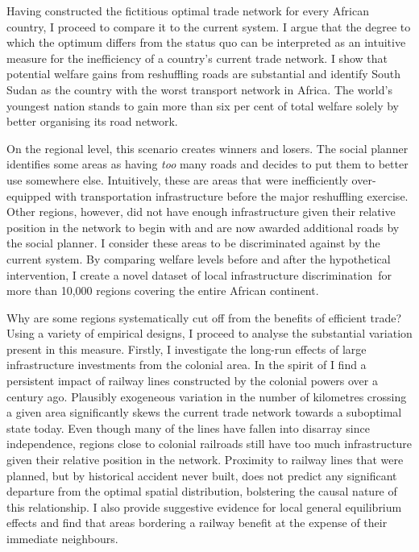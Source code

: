 \documentclass[11pt, oneside]{article}   	%
\begin{document}
Having constructed the fictitious optimal trade network for every African country, I proceed to compare it to the current system. I argue that the degree to which the optimum differs from the status quo can be interpreted as an intuitive measure for the inefficiency of a country's current trade network. I show that potential welfare gains from reshuffling roads are substantial and identify South Sudan as the country with the worst transport network in Africa. The world's youngest nation stands to gain more than six per cent of total welfare solely by better organising its road network.

On the regional level, this scenario creates winners and losers. The social planner identifies some areas as having \emph{too} many roads and decides to put them to better use somewhere else. Intuitively, these are areas that were inefficiently over-equipped with transportation infrastructure before the major reshuffling exercise. Other regions, however, did not have enough infrastructure given their relative position in the network to begin with and are now awarded additional roads by the social planner. I consider these areas to be discriminated against by the current system. By comparing welfare levels before and after the hypothetical intervention, I create a novel dataset of local infrastructure discrimination for more than 10,000 regions covering the entire African continent.

Why are some regions systematically cut off from the benefits of efficient trade? Using a variety of empirical designs, I proceed to analyse the substantial variation present in this measure. Firstly, I investigate the long-run effects of large infrastructure investments from the colonial area. In the spirit of \cite{jedwab_permanent_2016} I find a persistent impact of railway lines constructed by the colonial powers over a century ago. Plausibly exogeneous variation in the number of kilometres crossing a given area significantly skews the current trade network towards a suboptimal state today. Even though many of the lines have fallen into disarray since independence, regions close to colonial railroads still have too much infrastructure given their relative position in the network. Proximity to railway lines that were planned, but by historical accident never built, does not predict any significant departure from the optimal spatial distribution, bolstering the causal nature of this relationship. I also provide suggestive evidence for local general equilibrium effects and find that areas bordering a railway benefit at the expense of their immediate neighbours.
\end{document}
